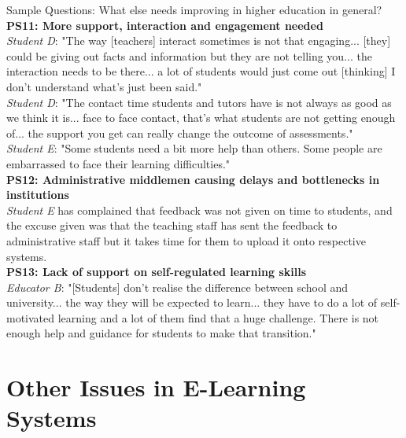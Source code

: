 Sample Questions: What else needs improving in higher education in general?
\vspace{0.25cm}\\
\textbf{PS11: More support, interaction and engagement needed}\\
\textit{Student D}: "The way [teachers] interact sometimes is not that engaging... [they] could be 
giving out facts and information but they are not telling you... the interaction needs to be 
there... a lot of students would just come out [thinking] I don't understand what's just been said."\\
\textit{Student D}: "The contact time students and tutors have is not always as good as we think it is...
face to face contact, that's what students are not getting enough of... the support you get can really 
change the outcome of assessments."\\
\textit{Student E}: "Some students need a bit more help than others. Some people are embarrassed to 
face their learning difficulties."
\vspace{0.25cm}\\
\textbf{PS12: Administrative middlemen causing delays and bottlenecks in institutions}\\
\textit{Student E} has complained that feedback was not given on time to students, and the excuse 
given was that the teaching staff has sent the feedback to administrative staff but it takes time for 
them to upload it onto respective systems.
\vspace{0.25cm}\\
\textbf{PS13: Lack of support on self-regulated learning skills}\\
\textit{Educator B}: "[Students] don't realise the difference between school and university... the way 
they will be expected to learn... they have to do a lot of self-motivated learning and a lot of them 
find that a huge challenge. There is not enough help and guidance for students to make that transition."

\section{Other Issues in E-Learning Systems}

